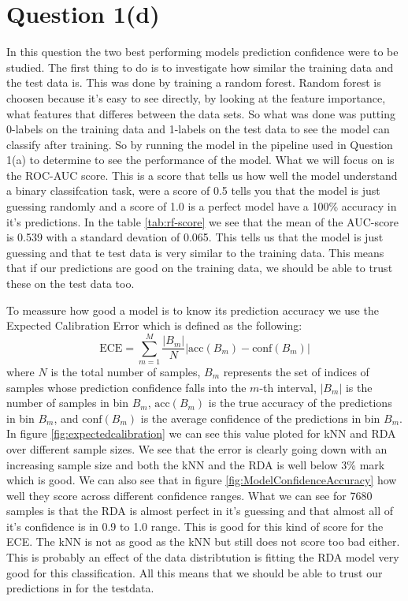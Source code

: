 \documentclass[11pt]{article}
\begin{document}
\section{Question 1(d)}
In this question the two best performing models prediction confidence were to be studied. The first thing to do is to investigate how similar the training data and the test data is. This was done by training a random forest. Random forest is choosen because it's easy to see directly, by looking at the feature importance, what features that differes between the data sets. So what was done was putting 0-labels on the training data and 1-labels on the test data to see the model can classify after training. So by running the model in the pipeline used in Question 1(a) to determine to see the performance of the model. What we will focus on is the ROC-AUC score. This is a score that tells us how well the model understand a binary classifcation task, were a score of 0.5 tells you that the model is just guessing randomly and a score of 1.0 is a perfect model have a 100\% accuracy in it's predictions. In the table \ref{tab:rf-score} we see that the mean of the AUC-score is 0.539 with a standard devation of 0.065. This tells us that the model is just guessing and that te test data is very similar to the training data. This means that if our predictions are good on the training data, we should be able to trust these on the test data too.

To meassure how good a model is to know its prediction accuracy we use the Expected Calibration Error which is defined as the following:
\begin{equation}
	\text{ECE} = \sum_{m=1}^{M} \frac{|B_m|}{N} \left| \text{acc}(B_m) - \text{conf}(B_m) \right|
\end{equation}
where $N$ is the total number of samples, $B_m$ represents the set of indices of samples whose prediction confidence falls into the $m$-th interval, $|B_m|$ is the number of samples in bin $B_m$, $\text{acc}(B_m)$ is the true accuracy of the predictions in bin $B_m$, and $\text{conf}(B_m)$ is the average confidence of the predictions in bin $B_m$. In figure \ref{fig:expectedcalibration} we can see this value ploted for kNN and RDA over different sample sizes. We see that the error is clearly going down with an increasing sample size and both the kNN and the RDA is well below 3\% mark which is good. We can also see that in figure \ref{fig:ModelConfidenceAccuracy} how well they score across different confidence ranges. What we can see for 7680 samples is that the RDA is almost perfect in it's guessing and that almost all of it's confidence is in 0.9 to 1.0 range. This is good for this kind of score for the ECE. The kNN is not as good as the kNN but still does not score too bad either. This is probably an effect of the data distribtution is fitting the RDA model very good for this classification. All this means that we should be able to trust our predictions in for the testdata.
\end{document}
